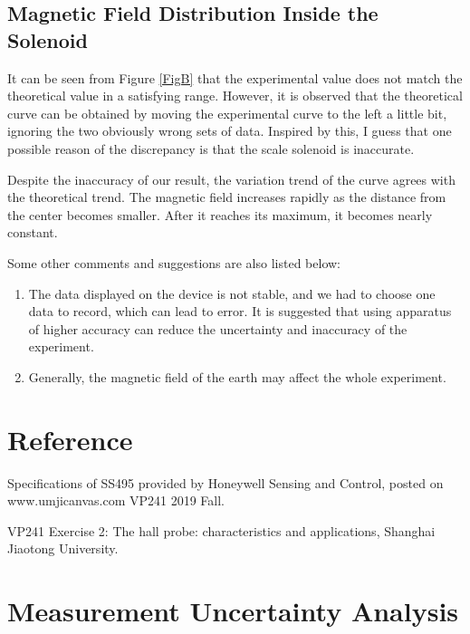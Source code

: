 \documentclass{article}
\begin{document}
	
	
	\subsection{Magnetic Field Distribution Inside the Solenoid}
	
It can be seen from Figure \ref{FigB} that the experimental value does not match the theoretical value in a satisfying range. However, it is observed that the theoretical curve can be obtained by moving the experimental curve to the left a little bit, ignoring the two obviously wrong sets of data. Inspired by this, I guess that one possible reason of the discrepancy  is that the scale solenoid is inaccurate.

Despite the inaccuracy of our result, the variation trend of the curve agrees with the theoretical trend. The magnetic field increases rapidly as the distance from the center becomes smaller. After it reaches its maximum, it becomes nearly constant.

\vspace{0.5cm}

Some other comments and suggestions are also listed below:
\begin{enumerate}
\item The data displayed on the device is not stable, and we had to choose one data to record, which can lead to error. It is suggested that using apparatus of higher accuracy can reduce the uncertainty and inaccuracy of the experiment.
\item Generally, the magnetic field of the earth may affect the whole experiment.
\end{enumerate}



		\section{Reference}

\noindent [1] Specifications of SS495 provided by Honeywell Sensing and Control, posted on www.umjicanvas.com VP241 2019 Fall.

\noindent [2] VP241 Exercise 2: The hall probe: characteristics and applications, Shanghai Jiaotong University.



\newpage



\appendix



		\section{Measurement Uncertainty Analysis}
\end{document}
